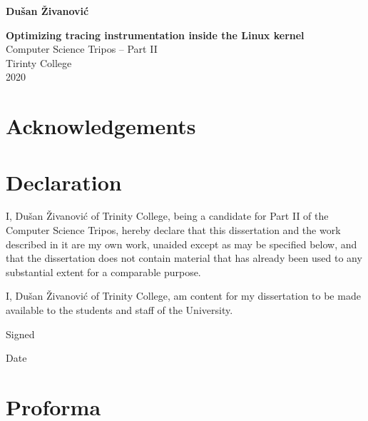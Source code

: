 \documentclass[12pt,twoside,notitlepage]{report}
\begin{document}


\pagestyle{empty}

\hfill{\LARGE \bf Dušan Živanović}

\vspace*{60mm}
\begin{center}
\Huge
{\bf Optimizing tracing instrumentation inside the Linux kernel} \\
\vspace*{5mm}
Computer Science Tripos -- Part II \\
\vspace*{5mm}
Tirinty College \\
\vspace*{5mm}
2020
\end{center}



\setcounter{page}{1}
\pagestyle{plain}

\chapter*{Acknowledgements}
\chapter*{Declaration}
    I, Dušan Živanović of Trinity College, being a candidate for Part II of the Computer Science Tripos, hereby declare that this dissertation and the work described in it are my own work, unaided except as may be specified below, and that the dissertation does not contain material that has already been used to any substantial extent for a comparable purpose. 

    I, Dušan Živanović of Trinity College, am content for my dissertation to be made available to the students and staff of the University. 

    Signed 

    Date 

    \bigskip

    \medskip


\chapter*{Proforma}
\end{document}
